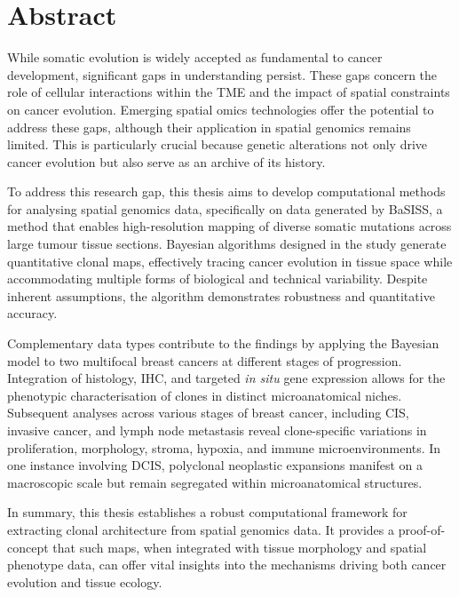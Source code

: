 \chapter*{Abstract}

While somatic evolution is widely accepted as fundamental to cancer development, significant gaps in understanding persist. These gaps concern the role of cellular interactions within the \acf{TME} and the impact of spatial constraints on cancer evolution. Emerging spatial omics technologies offer the potential to address these gaps, although their application in spatial genomics remains limited. This is particularly crucial because genetic alterations not only drive cancer evolution but also serve as an archive of its history.

To address this research gap, this thesis aims to develop computational methods for analysing spatial genomics data, specifically on data generated by \acf{BaSISS}, a method that enables high-resolution mapping of diverse somatic mutations across large tumour tissue sections. Bayesian algorithms designed in the study generate quantitative clonal maps, effectively tracing cancer evolution in tissue space while accommodating multiple forms of biological and technical variability. Despite inherent assumptions, the algorithm demonstrates robustness and quantitative accuracy.

Complementary data types contribute to the findings by applying the Bayesian model to two multifocal breast cancers at different stages of progression. Integration of histology, \acf{IHC}, and targeted \textit{in situ} gene expression allows for the phenotypic characterisation of clones in distinct microanatomical niches. Subsequent analyses across various stages of breast cancer, including \acl{CIS}, invasive cancer, and lymph node metastasis reveal clone-specific variations in proliferation, morphology, stroma, hypoxia, and immune microenvironments. In one instance involving \acl{DCIS}, polyclonal neoplastic expansions manifest on a macroscopic scale but remain segregated within microanatomical structures. 

In summary, this thesis establishes a robust computational framework for extracting clonal architecture from spatial genomics data. It provides a proof-of-concept that such maps, when integrated with tissue morphology and spatial phenotype data, can offer vital insights into the mechanisms driving both cancer evolution and tissue ecology.



